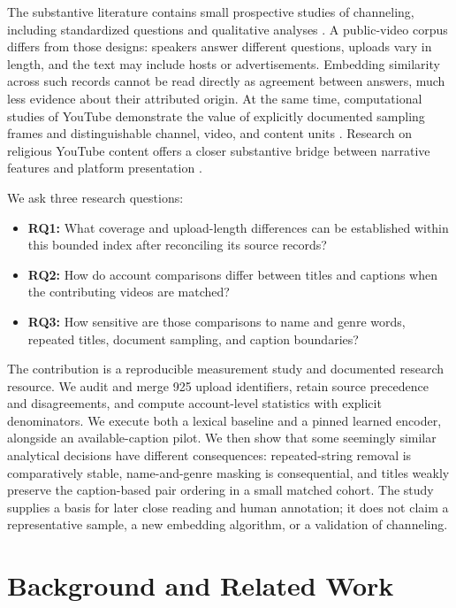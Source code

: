 The substantive literature contains small prospective studies of channeling, including standardized questions and qualitative analyses \citep{anastasia2020qualitative,wahbeh2023answers,wahbeh2026semantic,wahbeh2026qualitative}. A public-video corpus differs from those designs: speakers answer different questions, uploads vary in length, and the text may include hosts or advertisements. Embedding similarity across such records cannot be read directly as agreement between answers, much less evidence about their attributed origin. At the same time, computational studies of YouTube demonstrate the value of explicitly documented sampling frames and distinguishable channel, video, and content units \citep{ribeiro2021youniverse}. Research on religious YouTube content offers a closer substantive bridge between narrative features and platform presentation \citep{chen2026digital}.

We ask three research questions:
\begin{itemize}
\item \textbf{RQ1:} What coverage and upload-length differences can be established within this bounded index after reconciling its source records?
\item \textbf{RQ2:} How do account comparisons differ between titles and captions when the contributing videos are matched?
\item \textbf{RQ3:} How sensitive are those comparisons to name and genre words, repeated titles, document sampling, and caption boundaries?
\end{itemize}

The contribution is a reproducible measurement study and documented research resource. We audit and merge 925 upload identifiers, retain source precedence and disagreements, and compute account-level statistics with explicit denominators. We execute both a lexical baseline and a pinned learned encoder, alongside an available-caption pilot. We then show that some seemingly similar analytical decisions have different consequences: repeated-string removal is comparatively stable, name-and-genre masking is consequential, and titles weakly preserve the caption-based pair ordering in a small matched cohort. The study supplies a basis for later close reading and human annotation; it does not claim a representative sample, a new embedding algorithm, or a validation of channeling.

\section{Background and Related Work}
